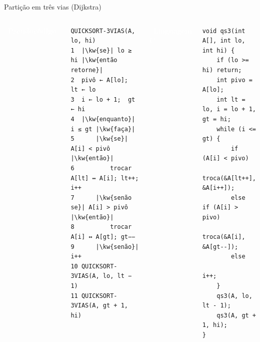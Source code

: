 \documentclass[aspectratio=169,10pt]{beamer}
\newcommand{\kw}[1]{\textbf{#1}}
\newcommand{\tagbox}[3]{\colorbox{#1}{\textcolor{#2}{\strut\scriptsize\bfseries\ #3\ }}}
\begin{document}
\begin{frame}[fragile]{Partição em três vias (Dijkstra)}
 \begin{columns}[T]
   \tagbox{mblue}{white}{Pseudocódigo}\vspace{0.3em}
\begin{lstlisting}[style=pseudo]
QUICKSORT-3VIAS(A, lo, hi)
1  |\kw{se}| lo ≥ hi |\kw{então retorne}|
2  pivô ← A[lo];  lt ← lo
3  i ← lo + 1;  gt ← hi
4  |\kw{enquanto}| i ≤ gt |\kw{faça}|
5      |\kw{se}| A[i] < pivô |\kw{então}|
6          trocar A[lt] ↔ A[i]; lt++; i++
7      |\kw{senão se}| A[i] > pivô |\kw{então}|
8          trocar A[i] ↔ A[gt]; gt−−
9      |\kw{senão}| i++
10 QUICKSORT-3VIAS(A, lo, lt − 1)
11 QUICKSORT-3VIAS(A, gt + 1, hi)
\end{lstlisting}
   \tagbox{mred}{white}{Linguagem C}\vspace{0.3em}
\begin{lstlisting}[style=code]
void qs3(int A[], int lo, int hi) {
    if (lo >= hi) return;
    int pivo = A[lo];
    int lt = lo, i = lo + 1, gt = hi;
    while (i <= gt) {
        if (A[i] < pivo)
            troca(&A[lt++], &A[i++]);
        else if (A[i] > pivo)
            troca(&A[i], &A[gt--]);
        else
            i++;
    }
    qs3(A, lo, lt - 1);
    qs3(A, gt + 1, hi);
}
\end{lstlisting}
 \end{columns}
\end{frame}
\end{document}
